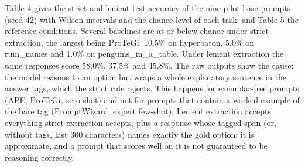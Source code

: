 \documentclass{ieeeaccess}
\begin{document}
Table 4 gives the strict and lenient test accuracy of the nine pilot base prompts (seed 42) with Wilson intervals \cite{wilson1927} and the chance level of each task, and Table 5 the reference conditions. Several baselines are at or below chance under strict extraction, the largest being ProTeGi: 10.5\% on hyperbaton, 5.0\% on ruin\_\allowbreak{}names and 1.0\% on penguins\_\allowbreak{}in\_\allowbreak{}a\_\allowbreak{}table. Under lenient extraction the same responses score 58.0\%, 37.5\% and 45.8\%. The raw outputs show the cause: the model reasons to an option but wraps a whole explanatory sentence in the answer tags, which the strict rule rejects. This happens for exemplar-free prompts (APE, ProTeGi, zero-shot) and not for prompts that contain a worked example of the bare tag (PromptWizard, expert few-shot). Lenient extraction accepts everything strict extraction accepts, plus a response whose tagged span (or, without tags, last 300 characters) names exactly the gold option; it is approximate, and a prompt that scores well on it is not guaranteed to be reasoning correctly.
\end{document}
